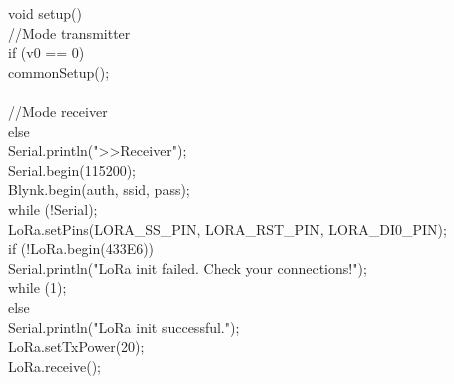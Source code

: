 \documentclass[conference, onecolumn]{IEEEtran}
\begin{document}
void setup() {\\
  //Mode transmitter\\
  if (v0 == 0) {\\
    commonSetup();\\
  }\\
  //Mode receiver\\
  else {\\
    Serial.println("\n>>Receiver");\\
    Serial.begin(115200);\\
    Blynk.begin(auth, ssid, pass);\\
    while (!Serial);\\

    LoRa.setPins(LORA_SS_PIN, LORA_RST_PIN, LORA_DI0_PIN);\\
    if (!LoRa.begin(433E6)) {\\
      Serial.println("LoRa init failed. Check your connections!");\\
      while (1);\\
    } else {\\
      Serial.println("LoRa init successful.");\\
      LoRa.setTxPower(20);\\
      LoRa.receive();\\
    }\\
  }\\
}\\
\end{document}
